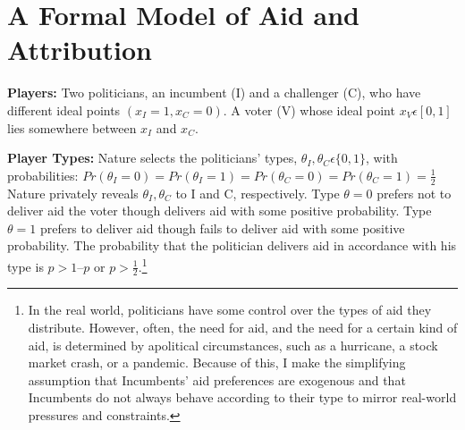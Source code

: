 \documentclass[12pt]{paper}
\begin{document}
\section{A Formal Model of Aid and Attribution}
\textbf{Players:} Two politicians, an incumbent (I) and a challenger (C), who have different ideal points $(x_I=1, x_C=0)$. A voter (V) whose ideal point $x_V \epsilon [0,1]$ lies somewhere between $x_I$ and $x_C.$

\textbf{Player Types:} Nature selects the politicians’ types, $\theta_I, \theta_C \epsilon \{0,1\}$, with probabilities: $Pr(\theta_I=0)=Pr(\theta_I=1)=Pr(\theta_C=0)=Pr(\theta_C=1)= \frac{1}{2}$ Nature privately reveals $\theta_I,\theta_C$ to I and C, respectively. Type $\theta=0$ prefers not to deliver aid the voter though delivers aid with some positive probability. Type $\theta=1$ prefers to deliver aid though fails to deliver aid with some positive probability. The probability that the politician delivers aid in accordance with his type is $p > 1 – p$ or $p > \frac{1}{2}$.\footnote{In the real world, politicians have some control over the types of aid they distribute. However, often, the need for aid, and the need for a certain kind of aid, is determined by apolitical circumstances, such as a hurricane, a stock market crash, or a pandemic. Because of this, I make the simplifying assumption that Incumbents' aid preferences are exogenous and that Incumbents do not always behave according to their type to mirror real-world pressures and constraints.}
\end{document}
